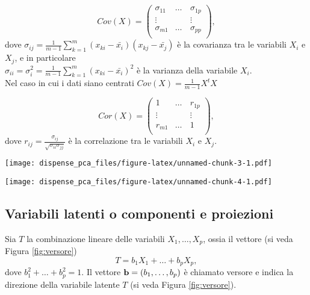 \documentclass[
  11pt,
]{book}
\begin{document}
\begin{equation}\label{eq:Corr}
Cov(X)=\left(
\begin{array}{cccc}
\sigma_{11}  & \dots & \sigma_{1p} \\
\vdots & \quad & \vdots \\
\sigma_{m1} & \dots & \sigma_{pp} \\
\end{array}
\right),
\end{equation}
dove \(\sigma_{ij}=\frac{1}{m-1}\sum_{k=1}^m(x_{ki}-\bar{x_i})(x_{kj}-\bar{x_j})\) è la covarianza tra
le variabili \(X_i\) e \(X_j\),
e in particolare\\
\(\sigma_{ii}=\sigma_i^2=\frac{1}{m-1}\sum_{k=1}^m(x_{ki}-\bar{x_i})^2\) è la varianza della variabile
\(X_i\).\\
Nel caso in cui i dati siano centrati \(Cov(X)=\frac{1}{m-1}X^tX\)

\begin{equation}\label{eq:Corr}
Cor(X)=\left(
\begin{array}{cccc}
1  & \dots & r_{1p} \\
\vdots & \quad & \vdots \\
r_{m1} & \dots & 1\\
\end{array}
\right),
\end{equation}
dove \(r_{ij}=\frac{\sigma_{ij}}{\sqrt{\sigma_{ii}\sigma_{jj}}}\) è la correlazione tra
le variabili \(X_i\) e \(X_j\).

\texttt{[image: dispense\_pca\_files/figure-latex/unnamed-chunk-3-1.pdf]}

\texttt{[image: dispense\_pca\_files/figure-latex/unnamed-chunk-4-1.pdf]}

\hypertarget{variabili-latenti-o-componenti-e-proiezioni}{%
\subsection{\texorpdfstring{Variabili latenti o componenti e proiezioni \label{par:VariabiliLatenti}}{Variabili latenti o componenti e proiezioni }}\label{variabili-latenti-o-componenti-e-proiezioni}}

Sia \(T\) la combinazione lineare delle variabili \(X_1,\dots,X_p\), ossia il vettore
(si veda Figura \ref{fig:versore})
\begin{equation}
T=b_1X_1+\dots+b_pX_p,
\end{equation}
dove \(b_1^2+\dots+b_p^2=1\). Il vettore \(\bold{b}=(b_1,\dots,b_p)\) è chiamato versore
e indica la direzione della variabile latente \(T\) (si veda Figura \ref{fig:versore}).
\end{document}
